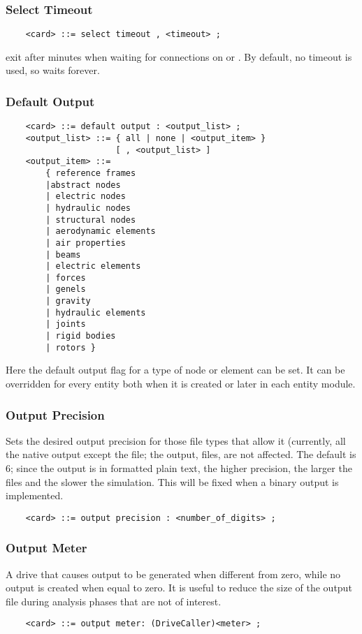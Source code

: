 \subsubsection{Select Timeout}
\begin{verbatim}
    <card> ::= select timeout , <timeout> ;
\end{verbatim}
exit after  minutes when waiting for connections 
on  or .
By default, no timeout is used, so  waits forever.

\subsubsection{Default Output}\label{sec:CONTROLDATA:DEFAULTOUTPUT}
\begin{verbatim}
    <card> ::= default output : <output_list> ;
    <output_list> ::= { all | none | <output_item> } 
                      [ , <output_list> ]
    <output_item> ::=
        { reference frames
        |abstract nodes
        | electric nodes
        | hydraulic nodes
        | structural nodes
        | aerodynamic elements
        | air properties
        | beams
        | electric elements
        | forces
        | genels
        | gravity
        | hydraulic elements
        | joints
        | rigid bodies
        | rotors }
\end{verbatim}
Here the default output flag for a type of node or element can be set. It
can be overridden for every entity both when it is created or later in
each entity module.

\subsubsection{Output Precision}
Sets the desired output precision for those file types that allow it
(currently, all the native output except the  file; the
 output,  files, are not affected.
The default is 6; since the output is in formatted plain text, the higher
precision, the larger the files and the slower the simulation.
This will be fixed when a binary output is implemented.
\begin{verbatim}
    <card> ::= output precision : <number_of_digits> ;
\end{verbatim}

\subsubsection{Output Meter}
A drive that causes output to be generated when different from zero,
while no output is created when equal to zero.  It is useful to reduce 
the size of the output file during analysis phases that are not of interest.
\begin{verbatim}
    <card> ::= output meter: (DriveCaller)<meter> ;
\end{verbatim}

